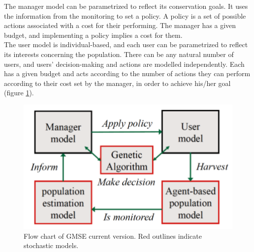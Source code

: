 \documentclass[12pt,a4paper]{article}
\begin{document}
The manager model can be parametrized to reflect its conservation goals. %
It uses the information from the monitoring to set a policy.
A policy is a set of possible actions associated with a cost for their performing. %
The manager has a given budget, and implementing a policy implies a cost for them.\\ %
The user model is individual-based, and each user can be parametrized to reflect its interests concerning the population.
There can be any natural number of users, and users' decision-making and actions are modelled independently.
Each has a given budget and acts according to the number of actions they can perform according to their cost set by the manager, in order to achieve his/her goal (figure \ref{gmse-diagram}). %
\begin{figure}
	\centering
	\includegraphics[scale=0.35]{gmse-diagram.png}
	\caption{Flow chart of GMSE current version. Red outlines indicate stochastic models.}
	\label{gmse-diagram}
\end{figure}
%
\end{document}
